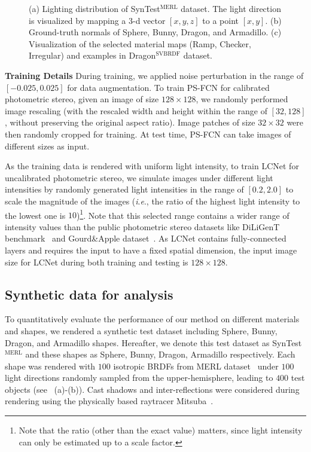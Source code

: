 \documentclass[10pt,journal,compsoc]{IEEEtran}
\newcommand{\ie}{\textit{i}.\textit{e}.}
\renewcommand{\paragraph}[1]{\vspace{0.2em}\noindent \textbf{#1 \hspace{0.2em}}}
\begin{document}
\begin{figure}[t] \centering
    
    \caption{(a) Lighting distribution of SynTest$^\text{MERL}$ dataset. The light direction is visualized by mapping a $3$-d vector $[x,y,z]$ to a point $[x,y]$. (b) Ground-truth normals of {\sc Sphere}, {\sc Bunny}, {\sc Dragon}, and {\sc Armadillo}. (c) Visualization of the selected material maps (Ramp, Checker, Irregular) and examples in {\sc Dragon$^\text{SVBRDF}$} dataset.} \label{fig:syn_test_sample}%
\end{figure}

\paragraph{Training Details} %
During training, we applied noise perturbation in the range of $[-0.025, 0.025]$ for data augmentation.
To train PS-FCN for calibrated photometric stereo, given an image of size $128\times 128$, we randomly performed image rescaling (with the rescaled width and height within the range of $[32, 128]$, without preserving the original aspect ratio). Image patches of size $32\times 32$ were then randomly cropped for training. At test time, PS-FCN can take images of different sizes as input.

As the training data is rendered with uniform light intensity, to train LCNet for uncalibrated photometric stereo, we simulate images under different light intensities by randomly generated light intensities in the range of $[0.2, 2.0]$ to scale the magnitude of the images (\ie, the ratio of the highest light intensity to the lowest one is $10$)\footnote{Note that the ratio (other than the exact value) matters, since light intensity can only be estimated up to a scale factor.}. Note that this selected range contains a wider range of intensity values than the public photometric stereo datasets like DiLiGenT benchmark~\cite{shi2018benchmark} and Gourd\&Apple dataset~\cite{alldrin2008p}. 
As LCNet contains fully-connected layers and requires the input to have a fixed spatial dimension, the input image size for LCNet during both training and testing is $128\times 128$.

\subsection{Synthetic data for analysis}
To quantitatively evaluate the performance of our method on different materials and shapes, we rendered a synthetic test dataset including Sphere, Bunny, Dragon, and Armadillo shapes. Hereafter, we denote this test dataset as SynTest$^{\text{MERL}}$ and these shapes as {\sc Sphere}, {\sc Bunny}, {\sc Dragon}, {\sc Armadillo} respectively. 
Each shape was rendered with $100$ isotropic BRDFs from MERL dataset~\cite{matusik2003merl} under $100$ light directions randomly sampled from the upper-hemisphere, leading to $400$ test objects (see ~(a)-(b)).
Cast shadows and inter-reflections were considered during rendering using the physically based raytracer Mitsuba~\cite{jakob2010mitsuba}. 
\end{document}
